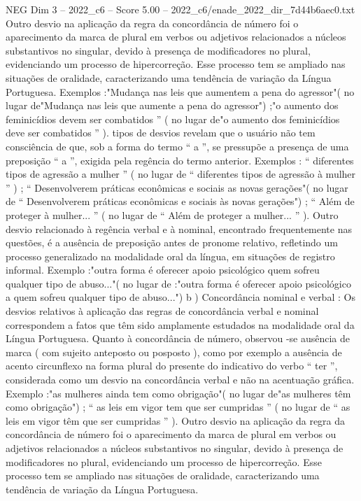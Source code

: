 \begin{textsample}{NEG Dim 3 – 2022\_c6 – Score 5.00 – 2022\_c6/enade\_2022\_dir\_7d44b6aec0.txt}
Outro desvio na aplicação da regra da concordância de número foi o aparecimento da marca de plural em verbos ou adjetivos relacionados a núcleos substantivos no singular, devido à presença de modificadores no plural, evidenciando um processo de hipercorreção.
Esse processo tem se ampliado nas situações de oralidade, caracterizando uma tendência de variação da Língua Portuguesa.
Exemplos :"Mudança nas leis que aumentem a pena do agressor"( no lugar de"Mudança nas leis que aumente a pena do agressor") ;"o aumento dos feminicídios devem ser combatidos ” ( no lugar de"o aumento dos feminicídios deve ser combatidos ” ). tipos de desvios revelam que o usuário não tem consciência de que, sob a forma do termo “ a ”, se pressupõe a presença de uma preposição “ a ”, exigida pela regência do termo anterior.
Exemplos : “ diferentes tipos de agressão a mulher ” ( no lugar de “ diferentes tipos de agressão à mulher ” ) ; “ Desenvolverem práticas econômicas e sociais as novas gerações"( no lugar de “ Desenvolverem práticas econômicas e sociais às novas gerações") ; “ Além de proteger à mulher... ” ( no lugar de “ Além de proteger a mulher... ” ).
Outro desvio relacionado à regência verbal e à nominal, encontrado frequentemente nas questões, é a ausência de preposição antes de pronome relativo, refletindo um processo generalizado na modalidade oral da língua, em situações de registro informal.
Exemplo :"outra forma é oferecer apoio psicológico quem sofreu qualquer tipo de abuso..."( no lugar de :"outra forma é oferecer apoio psicológico a quem sofreu qualquer tipo de abuso...") b ) Concordância nominal e verbal : Os desvios relativos à aplicação das regras de concordância verbal e nominal correspondem a fatos que têm sido amplamente estudados na modalidade oral da Língua Portuguesa.
Quanto à concordância de número, observou -se ausência de marca ( com sujeito anteposto ou posposto ), como por exemplo a ausência de acento circunflexo na forma plural do presente do indicativo do verbo “ ter ”, considerada como um desvio na concordância verbal e não na acentuação gráfica.
Exemplo :"as mulheres ainda tem como obrigação"( no lugar de"as mulheres têm como obrigação") ; “ as leis em vigor tem que ser cumpridas ” ( no lugar de “ as leis em vigor têm que ser cumpridas ” ).
Outro desvio na aplicação da regra da concordância de número foi o aparecimento da marca de plural em verbos ou adjetivos relacionados a núcleos substantivos no singular, devido à presença de modificadores no plural, evidenciando um processo de hipercorreção.
Esse processo tem se ampliado nas situações de oralidade, caracterizando uma tendência de variação da Língua Portuguesa.

\end{textsample}
